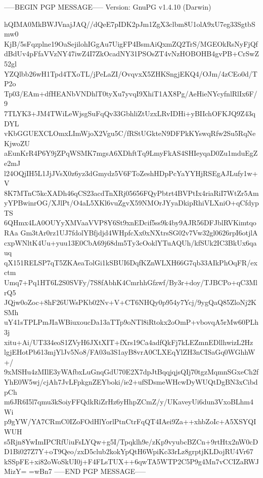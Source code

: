 -----BEGIN PGP MESSAGE-----
Version: GnuPG v1.4.10 (Darwin)

hQIMA0MkBWJVnajJAQ//dQeE7pIDK2pJm1ZgX3clbm8U1olA9xU7eg33SgtbSmw0
KjB/5sFqzplne19OaSejilohIGgAu7UigFP4BsmAiQxmZQ2TrS/MGEOkRsNyFjQf
dBdUv4pFfaVVzNY47iwZ4I7ZkOcadNY31PSOsZT4vNzHOBOHB4gvPB+CrSwZ52gl
YZQlbb26wH1Tpd4TXoTL/jPeLaZI/OvqvxX5ZHKSngjEKQ4/OJm/4zCEo0d/TP2o
Tp03/EAm+dfHEANbVNDhlT0tyXu7yvqI9XhiT1AX8Pg/AeHieNYcyfnlRlIx6F/9
7TLYK3+JM4TWiLeWjsgSuFqQv33GbhliZtUzxLRvIDHi+yBIIchOFKJQ9Z43qDYL
vKbGGUEXCLOmxLImWjoX2Vgu5C/fRStUGkteN9DFPkKYswqRfw2Su5RqNeKjwoZU
aEunKrR4P6Y9jZPqWSMK7mgsA6XDhftTq9LmyFkAS4SHIeyqaD0Zu1mduEgZe2mJ
l24OQjIH5L1JjJVsX0z6yz3dGmydz5V6FToZeshHDpPcYaYYHjRSEgAJLufy1w+V
8K7MTnC5kcXADh46qCS23acdTnXRj05656FQyPbtrt4BVPtIx4riaRiI7WtZr5Am
yYPBwinrOG/XJlPt/O4aL5XKl6vuZgvX59NMOrJYyaDkipRhiVLXniO+qCfdypTS
6QHmx4LA0OUYyXMVaaVVP8Y6St9xnEDcif5ss9k4by9AJR56DFJblRVKimtqoRAa
Gm3tAr0rz1UJ7fdolYBfjdjd4WHpfcXx0xNXtrsSG02v7Vw32gl0626rpI6otjlA
cxpWNltK4Uu+yuu13E0CbA69j68dm5Ty3cOoklYTuAQUh/kfSUk2IC3BkUx6qauq
qX151RELSP7qT5ZKAeaTolGi1kSBUI6DqfKZnWLXH66G7qb33AIkPhOqFR/exctm
Umq7+Pq1HT6L2S0SVFy/7S8fAbhK4CmrhhGfzwf/By3r+doy/TJBCPo+qC3MlrQ5
JQjw0oZoc+8hF26UWsPKb02Nv+V+CT6NHQy0p954y7Ycj/9ygQaQ85ZloNj2KSMh
uY41sTPLPmJIaWBiuxoucDa13aTTp9oNTl8iRtokx2oOmP+vbovqA5rMw60PLh3j
xitu+Ai/UT334eoS1ZVyH6JXtXIT+fXrs19Ca4adfQkFj7kLEZmnEDllhwizL2Hz
lgjEHotPb613mjYlJv5No8/FA03u3S1ayB8vrA0CLXEqYlZH3nCISaGq0WGhhW+/
9xMSHu4zMIlE3yWAfbxLuGnqGdU70E2X7dpJtBqqjqjsQIj70tgzMqmnSGxeCh2f
YhE0W5wj/cjAh7JvLFpkgnZEYboki/ie2+ufSDsmeWHcwDyWUQtDgBN3xCibdpCh
m6JR6I5l7qmu3kSoiyFFQdkRiZrHz6yHhpZCmZ/y/UKaveyUi6dun3VxoBLhm4Wi
p9gYW/YA7CRmC0IZoFOdHlYorlPtnCtrFqQT4IAei9Za++xhbZoIc+A5XSYQIWUH
s5Rjn8YwImIPCRfUiuFsLYQw+g5I/Tpqklh9e/zKp9vyubcBZCn+9rtHtx2nW0cD
D1Bi027Z7Y+oT9Qeo/zxD5club2kokYpQtH6WpiKc33rLz8grptjKLDojRU4Vr67
kSSpFE+xi82oWoSkUI0j+F4FLsTUX++6qwTA5WTP2C5P9g4Mn7vCCIZaRWJMizY=
=wBn7
-----END PGP MESSAGE-----
